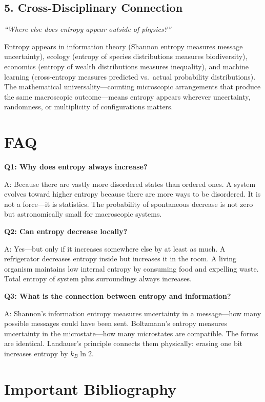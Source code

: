 \documentclass[11pt,openright]{book}
\begin{document}
\subsection*{5. Cross-Disciplinary Connection}
\textit{``Where else does entropy appear outside of physics?''}

Entropy appears in information theory (Shannon entropy measures message uncertainty), ecology (entropy of species distributions measures biodiversity), economics (entropy of wealth distributions measures inequality), and machine learning (cross-entropy measures predicted vs.\ actual probability distributions). The mathematical universality---counting microscopic arrangements that produce the same macroscopic outcome---means entropy appears wherever uncertainty, randomness, or multiplicity of configurations matters.


\section*{FAQ}

\textbf{Q1: Why does entropy always increase?}

A: Because there are vastly more disordered states than ordered ones. A system evolves toward higher entropy because there are more ways to be disordered. It is not a force---it is statistics. The probability of spontaneous decrease is not zero but astronomically small for macroscopic systems.

\textbf{Q2: Can entropy decrease locally?}

A: Yes---but only if it increases somewhere else by at least as much. A refrigerator decreases entropy inside but increases it in the room. A living organism maintains low internal entropy by consuming food and expelling waste. Total entropy of system plus surroundings always increases.

\textbf{Q3: What is the connection between entropy and information?}

A: Shannon's information entropy measures uncertainty in a message---how many possible messages could have been sent. Boltzmann's entropy measures uncertainty in the microstate---how many microstates are compatible. The forms are identical. Landauer's principle connects them physically: erasing one bit increases entropy by $k_B \ln 2$.
\section*{Important Bibliography}
\end{document}
